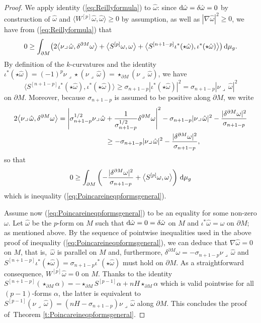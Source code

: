 \documentclass[pdftex]{sigma}
\numberwithin{equation}{section}
\begin{document}
\begin{proof}
We apply identity (\ref{eq:Reillyformula}) to $\hat{\omega}$: since ${\rm d}\hat{\omega}=\delta\hat{\omega}=0$ by construction of $\hat{\omega}$ and $\bigl\langle W^{[p]}\hat{\omega},\hat{\omega}\bigr\rangle\geq0$ by assumption,  as well as $|\nabla\hat{\omega}|^2\geq 0$, we have from (\ref{eq:Reillyformula}) that
\[0\geq\int_{\partial M}\bigl(2\bigl\langle\nu\lrcorner\,\hat{\omega},\delta^{\partial M}\omega\bigr\rangle+\bigl\langle S^{[p]}\omega,\omega\bigr\rangle+\bigl\langle S^{[n+1-p]}\iota^*(\star\hat{\omega}),\iota^*(\star\hat{\omega})\bigr\rangle\bigr)\,{\rm d}\mu_g.\]
By definition of the $k$-curvatures and the identity $\iota^*(\star\hat{\omega})=(-1)^p\nu\lrcorner\star(\nu\lrcorner\,\hat{\omega})=\star_{\partial M}(\nu\lrcorner\,\hat{\omega})$, we have
\begin{equation}\label{eq:sn1p}
\bigl\langle S^{[n+1-p]}\iota^*(\star\hat{\omega}),\iota^*(\star\hat{\omega})\bigr\rangle\geq\sigma_{n+1-p}|\iota^*(\star\hat{\omega})|^2=\sigma_{n+1-p}|\nu\lrcorner\,\hat{\omega}|^2
\end{equation}
on $\partial M$. Moreover, because $\sigma_{n+1-p}$ is assumed to be positive along $\partial M$,  we write
\begin{gather*}
2\bigl\langle\nu\lrcorner\,\hat{\omega},\delta^{\partial M}\omega\bigr\rangle=\Biggl|\sigma_{n+1-p}^{1/2}\nu\lrcorner\,\hat{\omega}+\frac{1}{\sigma_{n+1-p}^{1/2}}\delta^{\partial M}\omega\Biggr|^2-\sigma_{n+1-p}|\nu\lrcorner\,\hat{\omega}|^2-\frac{|\delta^{\partial M}\omega|^2}{\sigma_{n+1-p}}\\
\hphantom{2\bigl\langle\nu\lrcorner\,\hat{\omega},\delta^{\partial M}\omega\bigr\rangle}
\geq-\sigma_{n+1-p}|\nu\lrcorner\,\hat{\omega}|^2-\frac{|\delta^{\partial M}\omega|^2}{\sigma_{n+1-p}},
\end{gather*}
so that
\[0\geq \int_{\partial M}\left(-\frac{|\delta^{\partial M}\omega|^2}{\sigma_{n+1-p}}+\bigl\langle S^{[p]}\omega,\omega\bigr\rangle\right)\,{\rm d}\mu_g\]
which is inequality   (\ref{eq:Poincareineqpformsgeneral}).

Assume now (\ref{eq:Poincareineqpformsgeneral}) to be an equality for some non-zero $\omega$. Let $\hat{\omega}$ be the $p$-form on $M$ such that ${\rm d}\hat{\omega}=0=\delta\hat{\omega}$ on $M$ and $\iota^*\hat{\omega}=\omega$ on $\partial M$; as mentioned above.
By the sequence of pointwise i\-ne\-qua\-li\-ties used in the above proof of i\-ne\-qua\-li\-ty (\ref{eq:Poincareineqpformsgeneral}), we can deduce that $\nabla\hat{\omega}=0$ on $M$, that is,~$\hat{\omega}$ is parallel on $M$  and, furthermore, $\delta^{\partial M}\omega=-\sigma_{n+1-p}\nu\lrcorner\,\hat{\omega}$ and $S^{[n+1-p]}\iota^*(\star\hat{\omega})=\sigma_{n+1-p}\iota^*(\star\hat{\omega})$ must hold on $\partial M$.  As a straightforward consequence, $W^{[p]}\hat{\omega}=0$ on $M$. Thanks to the identity $S^{[n+1-p]}(\star_{\partial M}\alpha)=-\star_{\partial M}S^{[p-1]}\alpha+nH\star_{\partial M}\alpha$ which is valid pointwise for all $(p-1)$-forms $\alpha$, the latter is equivalent to $S^{[p-1]}(\nu\lrcorner\,\hat{\omega})=(nH-\sigma_{n+1-p})\nu\lrcorner\,\hat{\omega}$ along $\partial M$. This concludes the proof of~Theorem \ref{t:Poincareineqpformsgeneral}.
\end{proof}
\end{document}
